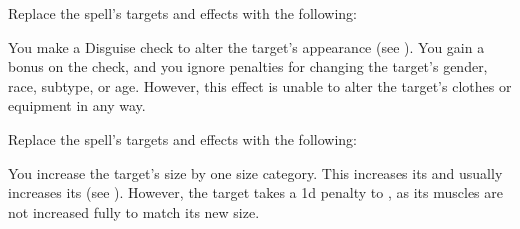 


Replace the spell's targets and effects with the following:
\begin{spellcontent}

\begin{augmenttargetinginfo}



\end{augmenttargetinginfo}


\begin{augmenteffects}



\spelleffect
You make a Disguise check to alter the target's appearance (see ).
You gain a  bonus on the check, and you ignore penalties for changing the target's gender, race, subtype, or age.
However, this effect is unable to alter the target's clothes or equipment in any way.








\end{augmenteffects}

\end{spellcontent}








Replace the spell's targets and effects with the following:
\begin{spellcontent}

\begin{augmenttargetinginfo}



\end{augmenttargetinginfo}


\begin{augmenteffects}



\spelleffect
You increase the target's size by one size category.
This increases its  and usually increases its  (see ).
However, the target takes a \minus1d penalty to , as its muscles are not increased fully to match its new size.








\end{augmenteffects}

\end{spellcontent}





